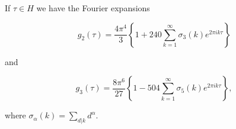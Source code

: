 If $\tau \in H$ we have the Fourier expansions

$$g_2(\tau) = \frac{4\pi^4}{3} \left\{ 1 + 240 \sum_{k=1}^{\infty} \sigma_3(k)e^{2\pi ik\tau} \right\}$$

and

$$g_3(\tau) = \frac{8\pi^6}{27} \left\{ 1 - 504 \sum_{k=1}^{\infty} \sigma_5(k)e^{2\pi ik\tau} \right\},$$

where $\sigma_\alpha(k) = \sum_{d|k} d^\alpha$.
